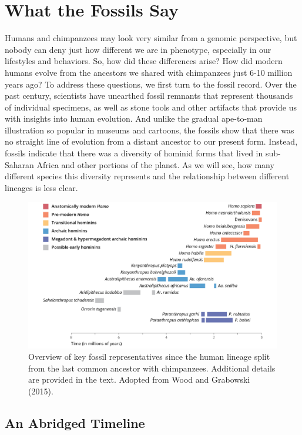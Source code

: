 \documentclass[
]{book}
\begin{document}
\hypertarget{what-the-fossils-say}{%
\section{What the Fossils Say}\label{what-the-fossils-say}}

Humans and chimpanzees may look very similar from a genomic perspective, but nobody can deny just how different we are in phenotype, especially in our lifestyles and behaviors. So, how did these differences arise? How did modern humans evolve from the ancestors we shared with chimpanzees just 6-10 million years ago? To address these questions, we first turn to the fossil record. Over the past century, scientists have unearthed fossil remnants that represent thousands of individual specimens, as well as stone tools and other artifacts that provide us with insights into human evolution. And unlike the gradual ape-to-man illustration so popular in museums and cartoons, the fossils show that there was no straight line of evolution from a distant ancestor to our present form. Instead, fossils indicate that there was a diversity of hominid forms that lived in sub-Saharan Africa and other portions of the planet. As we will see, how many different species this diversity represents and the relationship between different lineages is less clear.

\begin{figure}
\includegraphics[width=1\linewidth]{images/human_fossils} \caption{Overview of key fossil representatives since the human lineage split from the last common ancestor with chimpanzees. Additional details are provided in the text. Adopted from Wood and Grabowski (2015).}\label{fig:fossils}
\end{figure}

\hypertarget{an-abridged-timeline}{%
\subsection{An Abridged Timeline}\label{an-abridged-timeline}}
\end{document}
